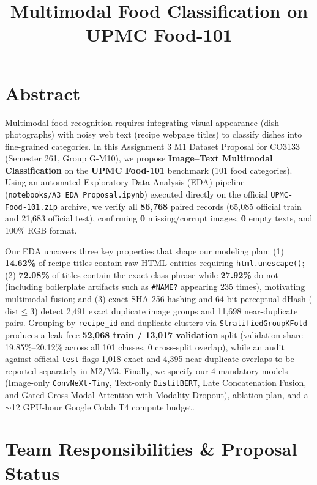 \documentclass[twoside,final]{hcmut-report}
\title{Multimodal Food Classification on UPMC Food-101}
\begin{document}
\coverpage

\section*{Abstract}
Multimodal food recognition requires integrating visual appearance (dish photographs) with noisy web text (recipe webpage titles) to classify dishes into fine-grained categories. In this Assignment 3 M1 Dataset Proposal for CO3133 (Semester 261, Group G-M10), we propose \textbf{Image--Text Multimodal Classification} on the \textbf{UPMC Food-101} benchmark (101 food categories). Using an automated Exploratory Data Analysis (EDA) pipeline (\texttt{notebooks/A3\_EDA\_Proposal.ipynb}) executed directly on the official \texttt{UPMC-Food-101.zip} archive, we verify all \textbf{86,768} paired records (65,085 official train and 21,683 official test), confirming \textbf{0} missing/corrupt images, \textbf{0} empty texts, and 100\% RGB format.

Our EDA uncovers three key properties that shape our modeling plan: (1) \textbf{14.62\%} of recipe titles contain raw HTML entities requiring \texttt{html.unescape()}; (2) \textbf{72.08\%} of titles contain the exact class phrase while \textbf{27.92\%} do not (including boilerplate artifacts such as \texttt{\#NAME?} appearing 235 times), motivating multimodal fusion; and (3) exact SHA-256 hashing and 64-bit perceptual dHash ($\text{dist} \le 3$) detect 2,491 exact duplicate image groups and 11,698 near-duplicate pairs. Grouping by \texttt{recipe\_id} and duplicate clusters via \texttt{StratifiedGroupKFold} produces a leak-free \textbf{52,068 train / 13,017 validation} split (validation share 19.85\%--20.12\% across all 101 classes, 0 cross-split overlap), while an audit against official \texttt{test} flags 1,018 exact and 4,395 near-duplicate overlaps to be reported separately in M2/M3. Finally, we specify our 4 mandatory models (Image-only \texttt{ConvNeXt-Tiny}, Text-only \texttt{DistilBERT}, Late Concatenation Fusion, and Gated Cross-Modal Attention with Modality Dropout), ablation plan, and a $\sim$12 GPU-hour Google Colab T4 compute budget.

\clearpage
\tableofcontents

\clearpage
\section{Team Responsibilities \& Proposal Status}
\end{document}
